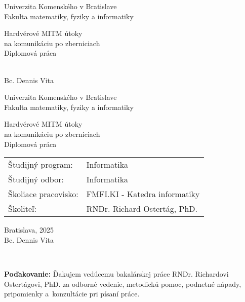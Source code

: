 \documentclass[12pt, twoside]{book}
\def\mfrok{2025}
\def\mfnazov{Hardvérové MITM útoky\\na komunikáciu po zberniciach}
\def\mftyp{Diplomová práca}
\def\mfautor{Bc. Dennis Vita}
\def\mfskolitel{RNDr. Richard Ostertág, PhD. }
\def\mfmiesto{Bratislava, \mfrok}
\def\mfodbor{ Informatika}
\def\program{ Informatika }
\def\mfpracovisko{ FMFI.KI - Katedra informatiky }
\begin{document}
\frontmatter
\pagestyle{empty}

\begin{center}
\sc\large
Univerzita Komenského v Bratislave\\
Fakulta matematiky, fyziky a informatiky

\vfill

{\LARGE\mfnazov}\\
\mftyp
\end{center}

\vfill

{\sc\large 
\noindent \mfrok\\
\mfautor
}

\cleardoublepage


\noindent
\setcounter{page}{1}

\begin{center}
\sc  
\large
Univerzita Komenského v Bratislave\\
Fakulta matematiky, fyziky a informatiky

\vfill

{\LARGE\mfnazov}\\
\mftyp
\end{center}

\vfill

\noindent
\begin{tabular}{ll}
Študijný program: & \program \\
Študijný odbor: & \mfodbor \\
Školiace pracovisko: & \mfpracovisko \\
Školiteľ: & \mfskolitel \\
\end{tabular}

\vfill


\noindent \mfmiesto\\
\mfautor

\cleardoublepage


\newpage 


\cleardoublepage


\newpage
\pagestyle{plain}
~

\vfill
{\bf Poďakovanie:} Ďakujem vedúcemu bakalárskej práce RNDr. Richardovi Ostertágovi, PhD. za odborné vedenie, metodickú pomoc, podnetné nápady, pripomienky a~konzultácie pri písaní práce.\\
\end{document}

